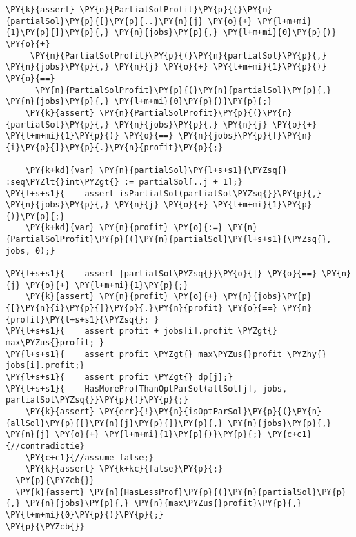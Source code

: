 \begin{Verbatim}[commandchars=\\\{\},fontsize=\footnotesize]
    \PY{k}{assert} \PY{n}{PartialSolProfit}\PY{p}{(}\PY{n}{partialSol}\PY{p}{[}\PY{p}{..}\PY{n}{j} \PY{o}{+} \PY{l+m+mi}{1}\PY{p}{]}\PY{p}{,} \PY{n}{jobs}\PY{p}{,} \PY{l+m+mi}{0}\PY{p}{)} \PY{o}{+}
     \PY{n}{PartialSolProfit}\PY{p}{(}\PY{n}{partialSol}\PY{p}{,} \PY{n}{jobs}\PY{p}{,} \PY{n}{j} \PY{o}{+} \PY{l+m+mi}{1}\PY{p}{)} \PY{o}{==}
      \PY{n}{PartialSolProfit}\PY{p}{(}\PY{n}{partialSol}\PY{p}{,} \PY{n}{jobs}\PY{p}{,} \PY{l+m+mi}{0}\PY{p}{)}\PY{p}{;}
    \PY{k}{assert} \PY{n}{PartialSolProfit}\PY{p}{(}\PY{n}{partialSol}\PY{p}{,} \PY{n}{jobs}\PY{p}{,} \PY{n}{j} \PY{o}{+} \PY{l+m+mi}{1}\PY{p}{)} \PY{o}{==} \PY{n}{jobs}\PY{p}{[}\PY{n}{i}\PY{p}{]}\PY{p}{.}\PY{n}{profit}\PY{p}{;}

    \PY{k+kd}{var} \PY{n}{partialSol}\PY{l+s+s1}{\PYZsq{} :seq\PYZlt{}int\PYZgt{} := partialSol[..j + 1];}
\PY{l+s+s1}{    assert isPartialSol(partialSol\PYZsq{}}\PY{p}{,} \PY{n}{jobs}\PY{p}{,} \PY{n}{j} \PY{o}{+} \PY{l+m+mi}{1}\PY{p}{)}\PY{p}{;}
    \PY{k+kd}{var} \PY{n}{profit} \PY{o}{:=} \PY{n}{PartialSolProfit}\PY{p}{(}\PY{n}{partialSol}\PY{l+s+s1}{\PYZsq{}, jobs, 0);}

\PY{l+s+s1}{    assert |partialSol\PYZsq{}}\PY{o}{|} \PY{o}{==} \PY{n}{j} \PY{o}{+} \PY{l+m+mi}{1}\PY{p}{;}
    \PY{k}{assert} \PY{n}{profit} \PY{o}{+} \PY{n}{jobs}\PY{p}{[}\PY{n}{i}\PY{p}{]}\PY{p}{.}\PY{n}{profit} \PY{o}{==} \PY{n}{profit}\PY{l+s+s1}{\PYZsq{}; }
\PY{l+s+s1}{    assert profit + jobs[i].profit \PYZgt{} max\PYZus{}profit; }
\PY{l+s+s1}{    assert profit \PYZgt{} max\PYZus{}profit \PYZhy{} jobs[i].profit;}
\PY{l+s+s1}{    assert profit \PYZgt{} dp[j];}
\PY{l+s+s1}{    HasMoreProfThanOptParSol(allSol[j], jobs, partialSol\PYZsq{}}\PY{p}{)}\PY{p}{;}
    \PY{k}{assert} \PY{err}{!}\PY{n}{isOptParSol}\PY{p}{(}\PY{n}{allSol}\PY{p}{[}\PY{n}{j}\PY{p}{]}\PY{p}{,} \PY{n}{jobs}\PY{p}{,} \PY{n}{j} \PY{o}{+} \PY{l+m+mi}{1}\PY{p}{)}\PY{p}{;} \PY{c+c1}{//contradictie}
    \PY{c+c1}{//assume false;}
    \PY{k}{assert} \PY{k+kc}{false}\PY{p}{;}
  \PY{p}{\PYZcb{}}
  \PY{k}{assert} \PY{n}{HasLessProf}\PY{p}{(}\PY{n}{partialSol}\PY{p}{,} \PY{n}{jobs}\PY{p}{,} \PY{n}{max\PYZus{}profit}\PY{p}{,} \PY{l+m+mi}{0}\PY{p}{)}\PY{p}{;}
\PY{p}{\PYZcb{}}
\end{Verbatim}

